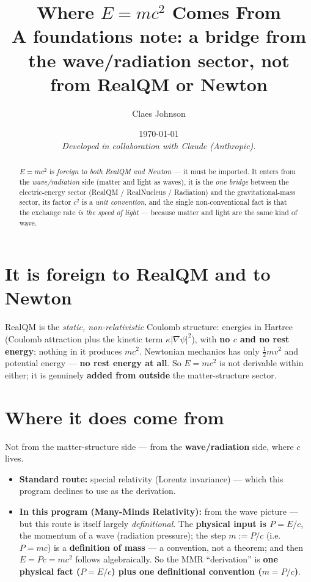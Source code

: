 \documentclass[11pt]{article}
\title{\textbf{Where $E=mc^2$ Comes From}\\[0.3em]
\large A foundations note: a bridge from the wave/radiation sector, not from RealQM or Newton}
\author[1]{Claes Johnson}
\affil[1]{KTH Royal Institute of Technology, Stockholm, Sweden \\ \texttt{claesjohnson@gmail.com}}
\date{\today \\[0.4em]\small\textit{Developed in collaboration with Claude (Anthropic).}}
\begin{document}
\maketitle

\begin{abstract}
$E=mc^2$ is \emph{foreign to both RealQM and Newton} --- it must be imported. It enters from the
\emph{wave/radiation} side (matter and light as waves), it is the \emph{one bridge} between the electric-energy
sector (RealQM / RealNucleus / Radiation) and the gravitational-mass sector, its factor $c^2$ is a \emph{unit
convention}, and the single non-conventional fact is that the exchange rate \emph{is the speed of light} ---
because matter and light are the same kind of wave.
\end{abstract}

\section{It is foreign to RealQM and to Newton}
RealQM is the \emph{static, non-relativistic} Coulomb structure: energies in Hartree (Coulomb attraction plus
the kinetic term $\kappa|\nabla\psi|^2$), with \textbf{no $c$ and no rest energy}; nothing in it produces
$mc^2$. Newtonian mechanics has only $\tfrac12 mv^2$ and potential energy --- \textbf{no rest energy at all}.
So $E=mc^2$ is not derivable within either; it is genuinely \textbf{added from outside} the matter-structure
sector.

\section{Where it does come from}
Not from the matter-structure side --- from the \textbf{wave/radiation} side, where $c$ lives.
\begin{itemize}
\item \textbf{Standard route:} special relativity (Lorentz invariance) --- which this program declines to use
as the derivation.
\item \textbf{In this program (Many-Minds Relativity):} from the wave picture --- but this route is itself
largely \emph{definitional}. The \textbf{physical input is $P=E/c$}, the momentum of a wave (radiation
pressure); the step $m:=P/c$ (i.e.\ $P=mc$) is a \textbf{definition of mass} --- a convention, not a theorem;
and then $E=Pc=mc^2$ follows algebraically. So the MMR ``derivation'' is \textbf{one physical fact ($P=E/c$)
plus one definitional convention ($m=P/c$)}.
\end{itemize}
\end{document}
